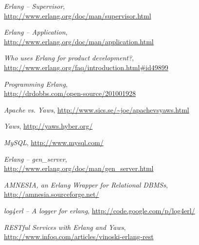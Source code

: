 \begin{thebibliography}{3}
 \emph{Erlang -- Supervisor}, \\
  \url{http://www.erlang.org/doc/man/supervisor.html}

 \emph{Erlang -- Application}, \\
  \url{http://www.erlang.org/doc/man/application.html}

 \emph{Who uses Erlang for product development?}, \\
  \url{http://www.erlang.org/faq/introduction.html#id49899}

 \emph{Programming Erlang}, \\
  \url{http://drdobbs.com/open-source/201001928}

 \emph{Apache vs. Yaws}, \url{http://www.sics.se/~joe/apachevsyaws.html}

 \emph{Yaws}, \url{http://yaws.hyber.org/}

 \emph{MySQL}, \url{http://www.mysql.com/}

 \emph{Erlang -- gen\_server}, \\
  \url{http://www.erlang.org/doc/man/gen_server.html}

 \emph{AMNESIA, an Erlang Wrapper for Relational DBMSs}, \\
  \url{http://amnesia.sourceforge.net/}

 \emph{log4erl -- A logger for erlang}, \url{http://code.google.com/p/log4erl/}

 \emph{RESTful Services with Erlang and Yaws}, \\
  \url{http://www.infoq.com/articles/vinoski-erlang-rest}



\end{thebibliography} 
